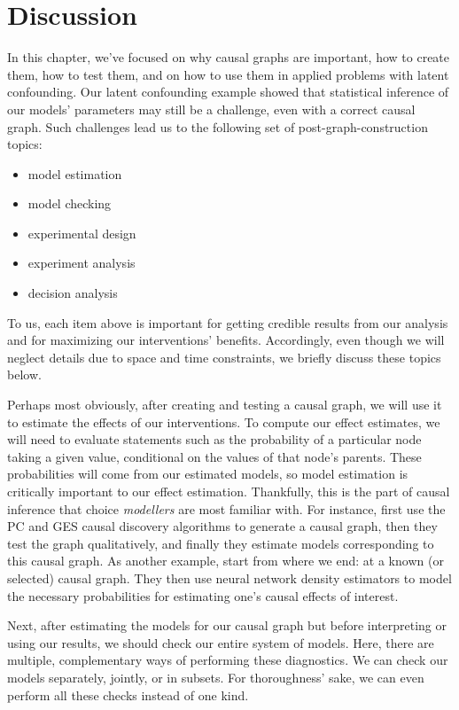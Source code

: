 \section{Discussion}
\label{sec:discussion}

In this chapter, we've focused on why causal graphs are important, how to create them, how to test them, and on how to use them in applied problems with latent confounding.
Our latent confounding example showed that statistical inference of our models' parameters may still be a challenge, even with a correct causal graph.
Such challenges lead us to the following set of post-graph-construction topics:
\begin{itemize}
   \item model estimation
   \item model checking
   \item experimental design
   \item experiment analysis
   \item decision analysis
\end{itemize}
To us, each item above is important for getting credible results from our analysis and for maximizing our interventions' benefits.
Accordingly, even though we will neglect details due to space and time constraints, we briefly discuss these topics below.

Perhaps most obviously, after creating and testing a causal graph, we will use it to estimate the effects of our interventions.
To compute our effect estimates, we will need to evaluate statements such as the probability of a particular node taking a given value, conditional on the values of that node's parents.
These probabilities will come from our estimated models, so model estimation is critically important to our effect estimation.
Thankfully, this is the part of causal inference that choice \textit{modellers} are most familiar with.
For instance, \citet{kostic_2020_uncovering} first use the PC and GES causal discovery algorithms to generate a causal graph, then they test the graph qualitatively, and finally they estimate models corresponding to this causal graph.
As another example, \citet{garrido_2020_estimating} start from where we end: at a known (or selected) causal graph.
They then use neural network density estimators to model the necessary probabilities for estimating one's causal effects of interest.

Next, after estimating the models for our causal graph but before interpreting or using our results, we should check our entire system of models.
Here, there are multiple, complementary ways of performing these diagnostics.
We can check our models separately, jointly, or in subsets.
For thoroughness' sake, we can even perform all these checks instead of one kind.

